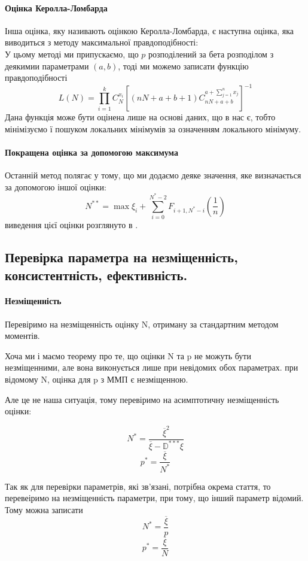 \documentclass{article}
\begin{document}
\paragraph{Оцінка Керолла-Ломбарда}
Інша оцінка, яку називають оцінкою Керолла-Ломбарда, є наступна оцінка, яка виводиться з методу
максимальної правдоподібності: \\
У цьому методі ми припускаємо, що $p$ розподілений за бета розподілом з деякимии параметрами $(a,
b)$, тоді ми можемо записати функцію правдоподібності
$$
L(N) = \prod_{i=1}^{k} C_N^{x_i} \left[ (nN + a + b + 1) C_{nN + a + b}^{a + \sum_{j=1}^nx_j }
\right]^{-1}
$$
Дана функція може бути оцінена лише на основі даних, що в нас є, тобто мінімізуємо ї пошуком
локальних мінімумів за означенням локального мінімуму.

\paragraph{Покращена оцінка за допомогою максимума}
Останній метод полягає у тому, що ми додаємо деяке значення, яке визначається за допомогою іншої
оцінки:
$$
N^{**} = \max\xi_i + \sum_{i=0}^{N^* - 2}F_{i+1, N^* - i} \left(\frac{1}{n}\right)
$$
виведення цієї оцінки розглянуто в \cite{1}.

\subsection{Перевірка параметра на незміщенність, консистентність, ефективність.}
\paragraph{Незміщенність}
Перевіримо на незміщенність оцінку N, отриману за стандартним методом моментів.
   
Хоча ми і маємо теорему про те, що оцінки N та p не можуть бути незміщенними, але вона виконується
лише при невідомих обох параметрах. при відомому N, оцінка для p з ММП є незміщенною.

Але це не наша ситуація, тому перевіримо на асимптотичну незміщенність оцінки:

$$
    N^* = \frac{\overline{\xi}^2}{\overline{\xi} - \mathbb{D}^{***}\xi}
$$
$$
    p^* =  \frac{\overline{\xi}}{N^*}  
$$

Так як для перевірки параметрів, які зв'язані, потрібна окрема стаття, то перевеіримо на
незміщенність параметри, при тому, що інший параметр відомий. Тому можна записати 
$$
N^* = \frac{\overline\xi}{p}
$$
$$
p^* = \frac{\overline\xi}{N}
$$
\end{document}
